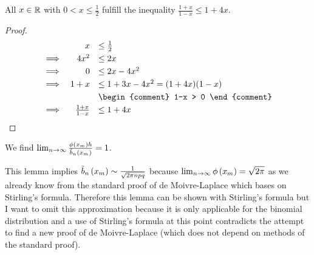 \begin{lemma}
  All $x\in\mathbb R$ with $0 < x \le \frac 12$ fulfill the inequality $\frac{1+x}{1-x} \le 1+4x$.
\end{lemma}

\begin{proof}
  \begin{align}
    \begin{array}{rrl}
      & x & \le \frac 12 \nl
      \implies & 4x^2 & \le 2x \nl
      \implies & 0 & \le  2x - 4x^2 \nl
      \implies & 1+x & \le  1+3x-4x^2 = (1+4x)(1-x) \nl
      &&
      \begin{comment}
        1-x > 0
      \end{comment} \nl
      \implies & \frac{1+x}{1-x} & \le 1+4x
    \end{array}
  \end{align}
\end{proof}

\begin{lemma}
  We find $\lim_{n\to\infty} \frac{\phi\left( {x_{m}} \right)h}{\tilde b_{n}\left({x_{m}}\right)} = 1$.
\end{lemma}

\begin{remark}
  This lemma implies $\tilde b_{n}\left({x_{m}}\right) \sim \frac{1}{\sqrt{2\pi npq}}$ because $\lim_{n\to\infty} \phi\left( {x_{m}} \right) = \sqrt{2\pi}$ as we already know from the standard proof of de Moivre-Laplace which bases on Stirling's formula. Therefore this lemma can be shown with Stirling's formula but I want to omit this approximation because it is only applicable for the binomial distribution and a use of Stirling's formula at this point contradicts the attempt to find a new proof of de Moivre-Laplace (which does not depend on methods of the standard proof).
\end{remark}

